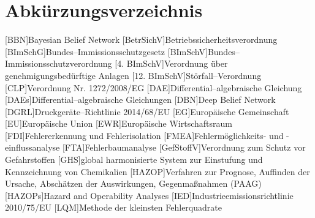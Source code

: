 \chapter*{Abk\"urzungsverzeichnis}
\begin{acronym}[12. BImSchV] %

 
  [BBN]{Bayesian Belief Network}
  [BetrSichV]{Betriebssicherheitsverordnung}
  [BImSchG]{Bundes--Immissionsschutzgesetz}
	[BImSchV]{Bundes--Immissionsschutzverordnung}
  [4. BImSchV]{Verordnung \"uber genehmigungsbed\"urftige Anlagen}
	[12. BImSchV]{St\"orfall--Verordnung}
  [CLP]{Verordnung Nr. 1272/2008/EG}
  [DAE]{Differential--algebraische Gleichung }
	[DAEs]{Differential--algebraische Gleichungen }
	[DBN]{Deep Belief Network}
  [DGRL]{Druckger\"ate--Richtlinie 2014/68/EU}
	[EG]{Europ\"aische Gemeinschaft} %
	[EU]{Europ\"aische Union} %
	[EWR]{Europ\"aische Wirtschaftsraum }
	[FDI]{Fehlererkennung und Fehlerisolation }
  [FMEA]{Fehlerm\"oglichkeits- und -einflussanalyse }
	[FTA]{Fehlerbaumanalyse }
	[GefStoffV]{Verordnung zum Schutz vor Gefahrstoffen}
	[GHS]{global harmonisierte System zur Einstufung und Kennzeichnung von Chemikalien}
	[HAZOP]{Verfahren zur Prognose, Auffinden der Ursache, Absch\"atzen der Auswirkungen, Gegenma\ss{}nahmen (PAAG) }
	[HAZOPs]{Hazard and Operability Analyses}
	[IED]{Industrieemissionsrichtlinie 2010/75/EU}
	[LQM]{Methode der kleinsten Fehlerquadrate }

\end{acronym}
